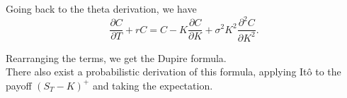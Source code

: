 Going back to the theta derivation, we have $$\dfrac{\partial C}{\partial T} + rC = C - K\dfrac{\partial C}{\partial K} + \sigma^2 K^2 \dfrac{\partial^2 C}{\partial K^2}.$$
 
Rearranging the terms, we get the Dupire formula.\\

There also exist a probabilistic derivation of this formula, applying Itô to the payoff $(S_T - K)^{+}$ and taking the expectation.












